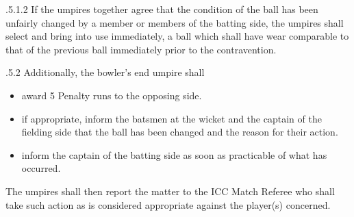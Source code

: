 \documentclass[12pt]{article}
\begin{document}
\vspace{\baselineskip}
\begin{adjustwidth}{2.0in}{0.11in}
{\fontsize{9pt}{10.8pt}.5.1.2 \tabto{1.99in} If the umpires together agree that the condition of the ball has been unfairly changed by a member or members of the batting side, the umpires shall select and bring into use immediately, a ball which shall have wear comparable to that of the previous ball immediately prior to the contravention.\par}\par

\end{adjustwidth}


\vspace{\baselineskip}
\begin{adjustwidth}{0.49in}{0.0in}
{\fontsize{9pt}{10.8pt}.5.2 \tabto{1.17in} Additionally, the bowler’s end umpire shall\par}\par

\end{adjustwidth}


\vspace{\baselineskip}
\begin{itemize}
	\item {\fontsize{9pt}{10.8pt}\selectfont award 5 Penalty runs to the opposing side.\par}\par


\vspace{\baselineskip}
	\item {\fontsize{9pt}{10.8pt}\selectfont if appropriate, inform the batsmen at the wicket and the captain of the fielding side that the ball has been changed and the reason for their action.\par}\par


\vspace{\baselineskip}
	\item {\fontsize{9pt}{10.8pt}\selectfont inform the captain of the batting side as soon as practicable of what has occurred.\par}
\end{itemize}\par


\vspace{\baselineskip}
\begin{adjustwidth}{1.12in}{0.04in}
{\fontsize{9pt}{10.8pt}\selectfont The umpires shall then report the matter to the ICC Match Referee who shall take such action as is considered appropriate against the player(s) concerned.\par}\par

\end{adjustwidth}
\end{document}
